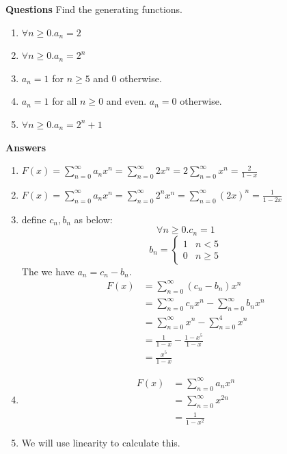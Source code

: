 \noindent \textbf{Questions} Find the generating functions.
\begin{enumerate}
    \item $\forall n \geq 0. a_n=2$
    \item $\forall n \geq 0. a_n=2^n$
    \item $a_n=1$ for $n \geq 5$ and 0 otherwise.
    \item $a_n=1$ for all $n \geq 0$ and even. $a_n=0$ otherwise.
    \item $\forall n \geq 0. a_n=2^n+1$
\end{enumerate}
\textbf{Answers}
\begin{enumerate}
    \item $F(x)=\sum_{n=0}^{\infty}a_nx^n=\sum_{n=0}^{\infty}2x^n=2\sum_{n=0}^{\infty}x^n=\frac{2}{1-x}$
    \item $F(x)=\sum_{n=0}^{\infty}a_nx^n=\sum_{n=0}^{\infty}2^nx^n=\sum_{n=0}^{\infty}(2x)^n=\frac{1}{1-2x}$
    \item define $c_n, b_n$ as below: 
    \begin{equation}
        \forall n \geq 0. c_n=1
    \end{equation} 
    \begin{equation}
        b_n = 
        \begin{cases}
            1& \text{$n<5$}\\
            0& \text{$n \geq 5$}
        \end{cases}
    \end{equation} 
    The we have $a_n=c_n-b_n$. 
    \begin{equation}
        \begin{split}
            F(x) &= \sum_{n=0}^{\infty}(c_n-b_n)x^n\\
            &= \sum_{n=0}^{\infty}c_nx^n - \sum_{n=0}^{\infty}b_nx^n\\
            &= \sum_{n=0}^{\infty}x^n - \sum_{n=0}^{4}x^n\\
            &= \frac{1}{1-x}- \frac{1-x^5}{1-x}\\
            &= \frac{x^5}{1-x}
        \end{split}
    \end{equation}
    \item \begin{equation}
        \begin{split}
            F(x) &= \sum_{n=0}^{\infty}a_nx^n\\
            &= \sum_{n=0}^{\infty}x^{2n}\\
            &= \frac{1}{1-x^2}
        \end{split}
    \end{equation}
    \item We will use linearity to calculate this.
\end{enumerate}

